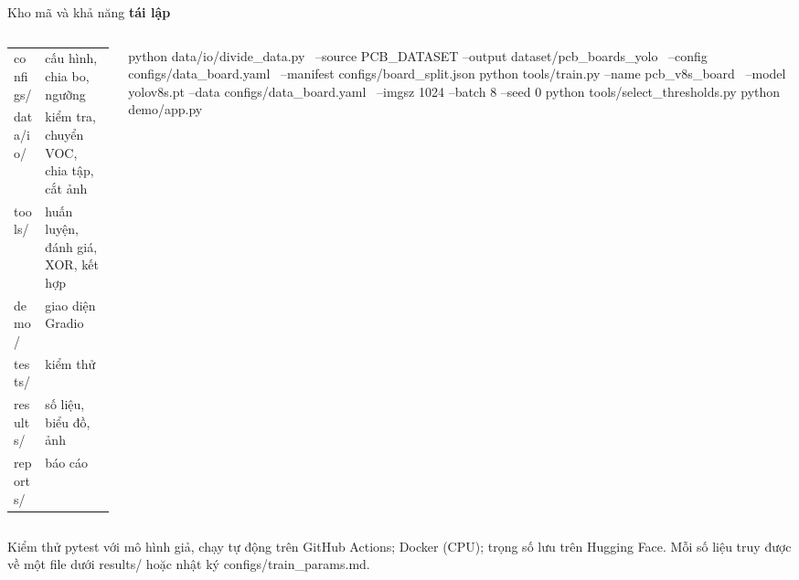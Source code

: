 \documentclass[aspectratio=169,11pt,t]{beamer}
\newcommand{\mycode}[1]{{\ttfamily\color{codeinl}#1}}
\newcommand{\hl}[1]{{\bfseries\color{coral}#1}}
\begin{document}
\begin{frame}[fragile]{Kho mã và khả năng \hl{tái lập}}
  \begin{columns}[T]
    \begin{column}{0.46\textwidth}
      \scriptsize
      \renewcommand{\arraystretch}{1.2}\setlength{\tabcolsep}{2pt}
      \begin{tabular}{@{}L{1.9cm}L{3.7cm}@{}}
        \mycode{configs/} & cấu hình, chia bo, ngưỡng \\
        \mycode{data/io/} & kiểm tra, chuyển VOC, chia tập, cắt ảnh \\
        \mycode{tools/} & huấn luyện, đánh giá, XOR, kết hợp \\
        \mycode{demo/} & giao diện Gradio \\
        \mycode{tests/} & kiểm thử \\
        \mycode{results/} & số liệu, biểu đồ, ảnh \\
        \mycode{reports/} & báo cáo \\
      \end{tabular}
    \end{column}
    \begin{column}{0.50\textwidth}
\begin{code}[style=dkx,basicstyle=\ttfamily\fontsize{6.5}{8}\selectfont\color{codefg}]
python data/io/divide_data.py \
  --source PCB_DATASET --output dataset/pcb_boards_yolo \
  --config configs/data_board.yaml \
  --manifest configs/board_split.json
python tools/train.py --name pcb_v8s_board \
  --model yolov8s.pt --data configs/data_board.yaml \
  --imgsz 1024 --batch 8 --seed 0
python tools/select_thresholds.py
python demo/app.py
\end{code}
    \end{column}
  \end{columns}
  \vspace{4pt}
  \begin{key}[Tái lập:]
    \footnotesize Kiểm thử \mycode{pytest} với mô hình giả, chạy tự động trên GitHub Actions; Docker (CPU); trọng số lưu trên Hugging Face. Mỗi số liệu truy được về một file dưới \mycode{results/} hoặc nhật ký \mycode{configs/train\_params.md}.
  \end{key}
\end{frame}
\end{document}
